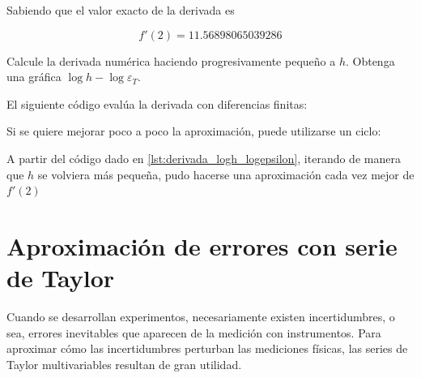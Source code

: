 \begin{ex}
    Sabiendo que el valor exacto de la derivada es

    \begin{equation*}
        f'(2) =11.56898065039286
    \end{equation*}

    Calcule la derivada numérica haciendo progresivamente pequeño a $h$.
    Obtenga una gráfica $\log h - \log \varepsilon_T$.

    \begin{solution}

        El siguiente código evalúa la derivada con diferencias finitas:

        

        Si se quiere mejorar poco a poco la aproximación, puede
        utilizarse un ciclo:

        

        A partir del código dado en \ref{lst:derivada_logh_logepsilon},
        iterando de manera que $h$ se volviera más pequeña, pudo hacerse
        una aproximación cada vez mejor de $f'(2)$

    \end{solution}
\end{ex}

\section{Aproximación de errores con serie de Taylor}

Cuando se desarrollan experimentos, necesariamente existen incertidumbres, o
sea, errores inevitables que aparecen de la medición con instrumentos. Para
aproximar cómo las incertidumbres perturban las mediciones físicas, las series
de Taylor multivariables resultan de gran utilidad.

